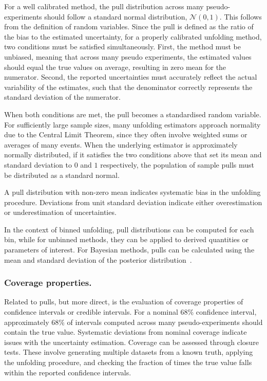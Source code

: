             For a well calibrated method, the pull distribution across many pseudo-experiments should follow a standard normal distribution, \(\mathcal{N}(0,1)\).
            This follows from the definition of random variables.
            Since the pull is defined as the ratio of the bias to the estimated uncertainty, for a properly calibrated unfolding method, two conditions must be satisfied simultaneously.
            First, the method must be unbiased, meaning that across many pseudo experiments, the estimated values should equal the true values on average, resulting in zero mean for the numerator.
            Second, the reported uncertainties must accurately reflect the actual variability of the estimates, such that the denominator correctly represents the standard deviation of the numerator.
            
            When both conditions are met, the pull becomes a standardised random variable.
            For sufficiently large sample sizes, many unfolding estimators approach normality due to the Central Limit Theorem, since they often involve weighted sums or averages of many events.
            When the underlying estimator is approximately normally distributed, if it satisfies the two conditions above that set its mean and standard deviation to \(0\) and \(1\) respectively, the population of sample pulls must be distributed as a standard normal.
            
            A pull distribution with non-zero mean indicates systematic bias in the unfolding procedure. 
            Deviations from unit standard deviation indicate either overestimation or underestimation of uncertainties.
            
            In the context of binned unfolding, pull distributions can be computed for each bin, while for unbinned methods, they can be applied to derived quantities or parameters of interest.
            For Bayesian methods, pulls can be calculated using the mean and standard deviation of the posterior distribution~\cite{Knapik2012BayesianPriors}.
        \subsubsection{Coverage properties.}
            Related to pulls, but more direct, is the evaluation of coverage properties of confidence intervals or credible intervals.
            For a nominal 68\% confidence interval, approximately 68\% of intervals computed across many pseudo-experiments should contain the true value.
            Systematic deviations from nominal coverage indicate issues with the uncertainty estimation.
            Coverage can be assessed through closure tests. These involve generating multiple datasets from a known truth, applying the unfolding procedure, and checking the fraction of times the true value falls within the reported confidence intervals.
            
